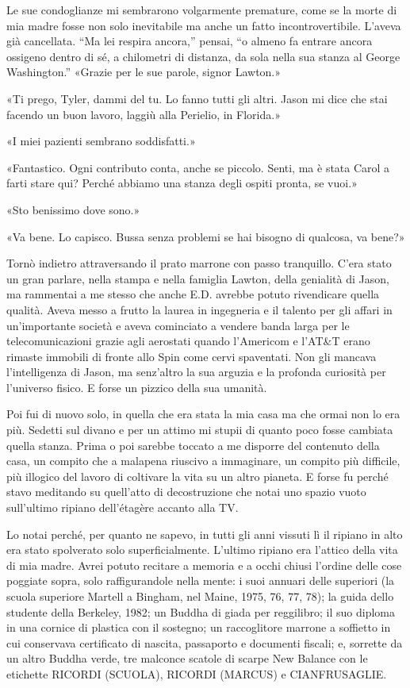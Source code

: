 Le sue condoglianze mi sembrarono volgarmente premature, come se la
morte di mia madre fosse non solo inevitabile ma anche un fatto
incontrovertibile. L'aveva già cancellata. ``Ma lei respira ancora,''
pensai, ``o almeno fa entrare ancora ossigeno dentro di sé, a chilometri
di distanza, da sola nella sua stanza al George Washington.'' «Grazie
per le sue parole, signor Lawton.»

«Ti prego, Tyler, dammi del tu. Lo fanno tutti gli altri. Jason mi dice
che stai facendo un buon lavoro, laggiù alla Perielio, in Florida.»

«I miei pazienti sembrano soddisfatti.»

«Fantastico. Ogni contributo conta, anche se piccolo. Senti, ma è stata
Carol a farti stare qui? Perché abbiamo una stanza degli ospiti pronta,
se vuoi.»

«Sto benissimo dove sono.»

«Va bene. Lo capisco. Bussa senza problemi se hai bisogno di qualcosa,
va bene?»

Tornò indietro attraversando il prato marrone con passo tranquillo.
C'era stato un gran parlare, nella stampa e nella famiglia Lawton, della
genialità di Jason, ma rammentai a me stesso che anche E.D. avrebbe
potuto rivendicare quella qualità. Aveva messo a frutto la laurea in
ingegneria e il talento per gli affari in un'importante società e aveva
cominciato a vendere banda larga per le telecomunicazioni grazie agli
aerostati quando l'Americom e l'AT\&T erano rimaste immobili di fronte
allo Spin come cervi spaventati. Non gli mancava l'intelligenza di
Jason, ma senz'altro la sua arguzia e la profonda curiosità per
l'universo fisico. E forse un pizzico della sua umanità.

Poi fui di nuovo solo, in quella che era stata la mia casa ma che ormai
non lo era più. Sedetti sul divano e per un attimo mi stupii di quanto
poco fosse cambiata quella stanza. Prima o poi sarebbe toccato a me
disporre del contenuto della casa, un compito che a malapena riuscivo a
immaginare, un compito più difficile, più illogico del lavoro di
coltivare la vita su un altro pianeta. E forse fu perché stavo meditando
su quell'atto di decostruzione che notai uno spazio vuoto sull'ultimo
ripiano dell'étagère accanto alla TV.

Lo notai perché, per quanto ne sapevo, in tutti gli anni vissuti lì il
ripiano in alto era stato spolverato solo superficialmente. L'ultimo
ripiano era l'attico della vita di mia madre. Avrei potuto recitare a
memoria e a occhi chiusi l'ordine delle cose poggiate sopra, solo
raffigurandole nella mente: i suoi annuari delle superiori (la scuola
superiore Martell a Bingham, nel Maine, 1975, 76, 77, 78); la guida
dello studente della Berkeley, 1982; un Buddha di giada per reggilibro;
il suo diploma in una cornice di plastica con il sostegno; un
raccoglitore marrone a soffietto in cui conservava certificato di
nascita, passaporto e documenti fiscali; e, sorrette da un altro Buddha
verde, tre malconce scatole di scarpe New Balance con le etichette
{RICORDI} ({SCUOLA}), {RICORDI} ({MARCUS}) e {CIANFRUSAGLIE}.

